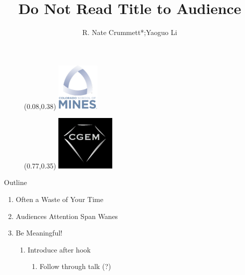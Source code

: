 \documentclass[light]{cgem-presentation}
\title{Do Not Read Title to Audience}
\author{R. Nate Crummett*;Yaoguo Li}
\begin{document}
  \begin{frame}[plain]
    \begin{figure}
      \begin{textblock*}{2.05cm}(0.08\paperwidth,0.38\paperheight)
        \includegraphics[width=2.05cm]{mines-2018}
      \end{textblock*}
    \end{figure}
    \begin{figure}
      \begin{textblock*}{2.85cm}(0.77\paperwidth,0.35\paperheight)
        \includegraphics[width=2.85cm]{cgem-logo}
      \end{textblock*}
    \end{figure}
    \maketitle{1cm}{1.2cm}{2mm}{-5mm}
  \end{frame}

  \begin{frame}{Outline}
    \begin{enumerate}
      \item Often a Waste of Your Time
      \item Audiences Attention Span Wanes
      \item Be Meaningful! \\[1mm]
      \begin{enumerate}
        \item Introduce after hook \\[2mm]
        \begin{enumerate}
          \item Follow through talk (?)
        \end{enumerate}
      \end{enumerate}
    \end{enumerate}
  \end{frame}
 
\end{document}
